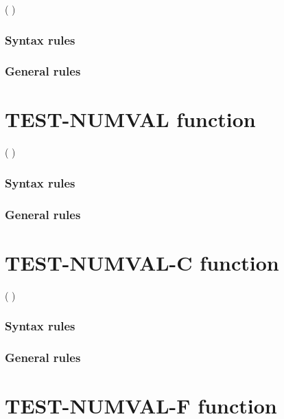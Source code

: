 \begin{syntax}
    ( \argument \argument )
\end{syntax}

\subsubsection{Syntax rules}

\subsubsection{General rules}

\section{TEST-NUMVAL function}

\begin{syntax}
    ( \argument )
\end{syntax}

\subsubsection{Syntax rules}

\subsubsection{General rules}

\section{TEST-NUMVAL-C function}

\begin{syntax}
    ( \argument \argument )
\end{syntax}

\subsubsection{Syntax rules}

\subsubsection{General rules}

\section{TEST-NUMVAL-F function}


